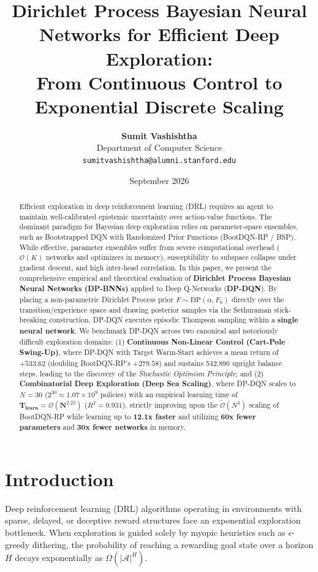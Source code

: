 \documentclass{article}
\title{\textbf{Dirichlet Process Bayesian Neural Networks for Efficient Deep Exploration:\\From Continuous Control to Exponential Discrete Scaling}}
\author{
  \textbf{Sumit Vashishtha} \\
  Department of Computer Science \\
  \texttt{sumitvashishtha@alumni.stanford.edu} %
}
\date{September 2026}
\begin{document}
\maketitle

\begin{abstract}
Efficient exploration in deep reinforcement learning (DRL) requires an agent to maintain well-calibrated epistemic uncertainty over action-value functions. The dominant paradigm for Bayesian deep exploration relies on parameter-space ensembles, such as Bootstrapped DQN with Randomized Prior Functions (BootDQN-RP / BSP). While effective, parameter ensembles suffer from severe computational overhead ($\mathcal{O}(K)$ networks and optimizers in memory), susceptibility to subspace collapse under gradient descent, and high inter-head correlation. In this paper, we present the comprehensive empirical and theoretical evaluation of \textbf{Dirichlet Process Bayesian Neural Networks (DP-BNNs)} applied to Deep Q-Networks (\textbf{DP-DQN}). By placing a non-parametric Dirichlet Process prior $F \sim \text{DP}(\alpha, F_0)$ directly over the transition/experience space and drawing posterior samples via the Sethuraman stick-breaking construction, DP-DQN executes episodic Thompson sampling within a \textbf{single neural network}. We benchmark DP-DQN across two canonical and notoriously difficult exploration domains: (1) \textbf{Continuous Non-Linear Control (Cart-Pole Swing-Up)}, where DP-DQN with Target Warm-Start achieves a mean return of $\mathbf{+533.62}$ (doubling BootDQN-RP's $+279.58$) and sustains 542,890 upright balance steps, leading to the discovery of the \textit{Stochastic Optimism Principle}; and (2) \textbf{Combinatorial Deep Exploration (Deep Sea Scaling)}, where DP-DQN scales to $N=30$ ($2^{30} \approx 1.07 \times 10^9$ policies) with an empirical learning time of $\mathbf{T_{\text{learn}} = \mathcal{O}(N^{2.25})}$ ($R^2 = 0.931$), strictly improving upon the $\tilde{\mathcal{O}}(N^3)$ scaling of BootDQN-RP while learning up to \textbf{12.1x faster} and utilizing \textbf{60x fewer parameters} and \textbf{30x fewer networks} in memory.
\end{abstract}

\section{Introduction}
Deep reinforcement learning (DRL) algorithms operating in environments with sparse, delayed, or deceptive reward structures face an exponential exploration bottleneck. When exploration is guided solely by myopic heuristics such as $\epsilon$-greedy dithering, the probability of reaching a rewarding goal state over a horizon $H$ decays exponentially as $\Omega(|\mathcal{A}|^H)$.
\end{document}
